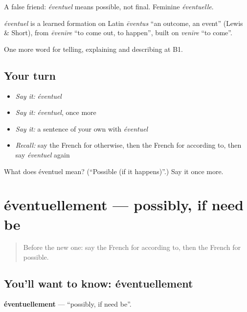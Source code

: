 A false friend: \emph{éventuel} means possible, not final. Feminine \emph{éventuelle}.

\begin{cousinweb}
\emph{éventuel} is a learned formation on Latin \emph{ēventus} \textquotedblleft{}an outcome, an event\textquotedblright{} (Lewis \& Short), from \emph{ēvenīre} \textquotedblleft{}to come out, to happen\textquotedblright{}, built on \emph{venīre} \textquotedblleft{}to come\textquotedblright{}.
\end{cousinweb}

\begin{grammarlens}[title={What you've built}]
One more word for telling, explaining and describing at B1.
\end{grammarlens}

\subsection*{Your turn}
\begin{itemize}
\raggedright
  \item \emph{Say it:} \emph{éventuel}
  \item \emph{Say it:} \emph{éventuel}, once more
  \item \emph{Say it:} a sentence of your own with \emph{éventuel}
  \item \emph{Recall:} say the French for otherwise, then the French for according to, then say \emph{éventuel} again
\end{itemize}

\begin{tcolorbox}[breakable,colback=teal!4,colframe=teal!35!black,title={Before you move on}]
What does éventuel mean? (\textquotedblleft{}Possible (if it happens)\textquotedblright{}.) Say it once more.
\end{tcolorbox}
\section[éventuellement]{éventuellement — possibly, if need be}

\label{lesson:FR-C369-eventuellement}



\begin{quote}
Before the new one: say the French for according to, then the French for possible.
\end{quote}

\subsection*{You'll want to know: éventuellement}
\textbf{éventuellement} — \textquotedblleft{}possibly, if need be\textquotedblright{}.

